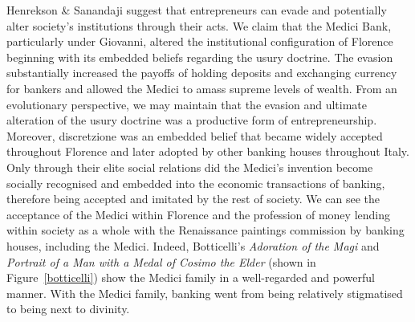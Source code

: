 Henrekson \& Sanandaji suggest that entrepreneurs can evade and potentially alter society's institutions through their acts. We claim that the Medici Bank, particularly under Giovanni, altered the institutional configuration of Florence beginning with its embedded beliefs regarding the usury doctrine. The evasion substantially increased the payoffs of holding deposits and exchanging currency for bankers and allowed the Medici to amass supreme levels of wealth. From an evolutionary perspective, we may maintain that the evasion and ultimate alteration of the usury doctrine was a productive form of entrepreneurship. Moreover, discretzione was an embedded belief that became widely accepted throughout Florence and later adopted by other banking houses throughout Italy. Only through their elite social relations did the Medici's invention become socially recognised and embedded into the economic transactions of banking, therefore being accepted and imitated by the rest of society. We can see the acceptance of the Medici within Florence and the profession of money lending within society as a whole with the Renaissance paintings commission by banking houses, including the Medici. Indeed, Botticelli's \emph{Adoration of the Magi} and \emph{Portrait of a Man with a Medal of Cosimo the Elder} (shown in Figure~\ref{botticelli}) show the Medici family in a well-regarded and powerful manner. With the Medici family, banking went from being relatively stigmatised to being next to divinity.

